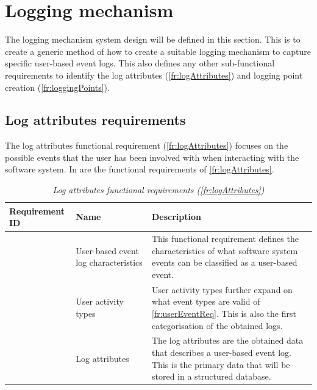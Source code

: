 \section{Logging mechanism}\label{sec:ch2_loggingMechanism}
The logging mechanism system design will be defined in this section. This is to create a generic method of how to create a suitable logging mechanism to capture specific user-based event logs. This also defines any other sub-functional requirements to identify the log attributes (\ref{fr:logAttributes}) and logging point creation (\ref{fr:loggingPoints}).

\subsection{Log attributes requirements}
The log attributes functional requirement (\ref{fr:logAttributes}) focuses on the possible events that the user has been involved with when interacting with the software system. In  are the functional requirements of \ref{fr:logAttributes}.

\setcounter{phase}{1}
\begin{table}[!htb]
	\centering
	\caption[Log attributes functional requirements (\ref{fr:logAttributes})]
	{\textit{Log attributes functional requirements (\ref{fr:logAttributes})}}
	\label{tbl:ch2_loggingAttributesFunctionalRequirements}
	\begin{tabularx}{\textwidth}{|l|l|X|}
		\hline \textbf{Requirement ID} & \textbf{Name} & \textbf{Description} \\
		\hline \subphase{fr:userEventReq} & \RaggedRight User-based event log characteristics & \RaggedRight This functional requirement defines the characteristics of what software system events can be classified as a user-based event. \\
		\hline \subphase{fr:userActReq} & \RaggedRight User activity types & \RaggedRight User activity types further expand on what event types are valid of \ref{fr:userEventReq}. This is also the first categorisation of the obtained logs.\\
		\hline \subphase{fr:subLogAttributes} & \RaggedRight Log attributes & \RaggedRight The log attributes are the obtained data that describes a user-based event log. This is the primary data that will be stored in a structured database.\\
		\hline
	\end{tabularx}
\end{table}

